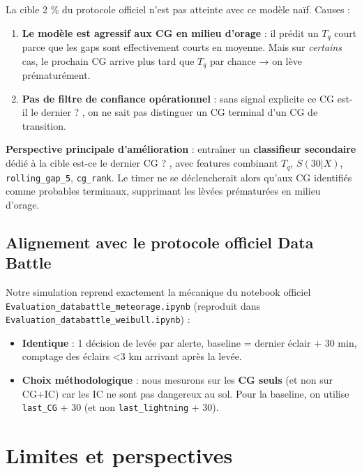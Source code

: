 \documentclass[11pt,a4paper]{article}
\begin{document}
\begin{tcolorbox}[colback=red!5,colframe=red!50!black,title=\textbf{Limites du modèle pur}]
La cible 2 \% du protocole officiel n'est pas atteinte avec ce modèle naïf. Causes :
\begin{enumerate}[topsep=2pt]
    \item \textbf{Le modèle est agressif aux CG en milieu d'orage} : il prédit un $T_q$ court
    parce que les gaps sont effectivement courts en moyenne. Mais sur \emph{certains} cas, le
    prochain CG arrive plus tard que $T_q$ par chance → on lève prématurément.
    \item \textbf{Pas de filtre de confiance opérationnel} : sans signal explicite \og ce CG
    est-il le dernier ? \fg{}, on ne sait pas distinguer un CG terminal d'un CG de transition.
\end{enumerate}

\textbf{Perspective principale d'amélioration} : entraîner un \textbf{classifieur secondaire}
dédié à la cible \og est-ce le dernier CG ? \fg{}, avec features combinant $T_q$, $S(30|X)$,
\texttt{rolling\_gap\_5}, \texttt{cg\_rank}. Le timer ne se déclencherait alors qu'aux CG
identifiés comme probables terminaux, supprimant les lèvées prématurées en milieu d'orage.
\end{tcolorbox}

\subsection{Alignement avec le protocole officiel Data Battle}

Notre simulation reprend exactement la mécanique du notebook officiel
\texttt{Evaluation\_databattle\_meteorage.ipynb} (reproduit dans
\texttt{Evaluation\_databattle\_weibull.ipynb}) :
\begin{itemize}[topsep=2pt]
    \item \textbf{Identique} : 1 décision de levée par alerte, baseline = dernier éclair
    + 30 min, comptage des éclairs <3 km arrivant après la levée.
    \item \textbf{Choix méthodologique} : nous mesurons sur les \textbf{CG seuls} (et non
    sur CG+IC) car les IC ne sont pas dangereux au sol. Pour la baseline, on utilise
    \texttt{last\_CG} + 30 (et non \texttt{last\_lightning} + 30).
\end{itemize}

\section{Limites et perspectives}
\end{document}
